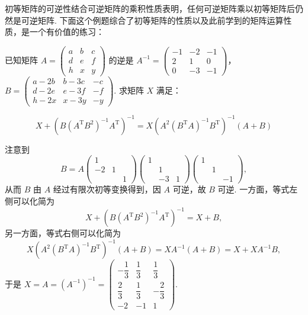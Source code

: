 初等矩阵的可逆性结合可逆矩阵的乘积性质表明，任何可逆矩阵乘以初等矩阵后仍然是可逆矩阵. 下面这个例题综合了初等矩阵的性质以及此前学到的矩阵运算性质，是一个有价值的练习：
\begin{example}{}{}
    已知矩阵 $A=\begin{pmatrix}a & b & c \\ d & e & f \\ h & x & y\end{pmatrix}$ 的逆是 $A^{-1}=\begin{pmatrix}-1 & -2 & -1 \\ 2 & 1 & 0 \\ 0 & -3 & -1\end{pmatrix}$，\\
    $B=\begin{pmatrix}a-2b & b-3c & -c \\ d-2e & e-3f & -f \\ h-2x & x-3y & -y\end{pmatrix}$. 求矩阵 $X$ 满足：

    \[X+\left(B(A^\mathrm{T}B^2)^{-1}A^\mathrm{T}\right)^{-1}=X\left(A^2(B^\mathrm{T}A)^{-1}B^\mathrm{T}\right)^{-1}(A+B)\]
\end{example}

\begin{solution}
    注意到
    \[B=A\begin{pmatrix}
            1 &  & \\ -2 & 1 & \\ & & 1
        \end{pmatrix} \begin{pmatrix}
            1 &  & \\ & 1 & \\ & -3 & 1
        \end{pmatrix} \begin{pmatrix}
            1 &  & \\ & 1 & \\ & & -1
        \end{pmatrix},\]
    从而 $B$ 由 $A$ 经过有限次初等变换得到，因 $A$ 可逆，故 $B$ 可逆. 一方面，等式左侧可以化简为
    \[X + \left(B\left(A^\mathrm{T} B^{2}\right)^{-1} A^\mathrm{T}\right)^{-1} = X + B,\]
    另一方面，等式右侧可以化简为
    \[X\left(A^{2}\left(B^\mathrm{T} A\right)^{-1} B^\mathrm{T}\right)^{-1}(A + B) = X A^{-1}(A + B) = X + X A^{-1} B,\]
    于是 $X = A = (A^{-1})^{-1} = \begin{pmatrix}
            -\dfrac{1}{3} & \dfrac{1}{3} & \dfrac{1}{3}  \\[0.5em]
            \dfrac{2}{3}  & \dfrac{1}{3} & -\dfrac{2}{3} \\
            -2           & -1          & 1
        \end{pmatrix}$.
\end{solution}

